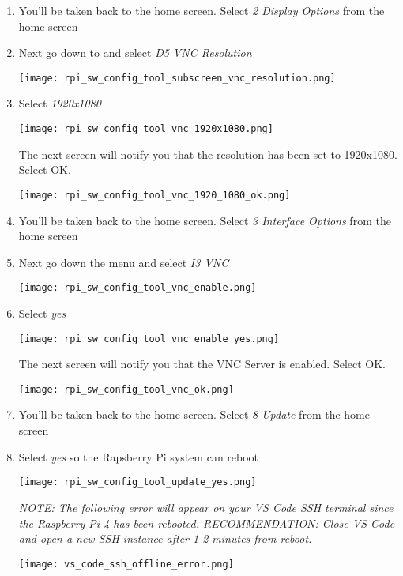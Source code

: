 \documentclass[journal]{IEEEtran}
\begin{document}
\begin{enumerate}
        \item You'll be taken back to the home screen. Select \emph{2 Display Options} from the home screen
        
        \item Next go down to and select \emph{D5 VNC Resolution}
        
        \texttt{[image: rpi\_sw\_config\_tool\_subscreen\_vnc\_resolution.png]}
        
        \item Select \emph{1920x1080}
        
        \texttt{[image: rpi\_sw\_config\_tool\_vnc\_1920x1080.png]}

        The next screen will notify you that the resolution has been set to 1920x1080. Select OK.

        \texttt{[image: rpi\_sw\_config\_tool\_vnc\_1920\_1080\_ok.png]}
        
        \item You'll be taken back to the home screen. Select \emph{3 Interface Options} from the home screen

        \item Next go down the menu and select \emph{I3 VNC}
        
        \texttt{[image: rpi\_sw\_config\_tool\_vnc\_enable.png]}

        \item Select \emph{yes}
        
        \texttt{[image: rpi\_sw\_config\_tool\_vnc\_enable\_yes.png]}

        The next screen will notify you that the VNC Server is enabled. Select OK.

        \texttt{[image: rpi\_sw\_config\_tool\_vnc\_ok.png]}

        \item You'll be taken back to the home screen. Select \emph{8 Update} from the home screen

        \item Select \emph{yes} so the Rapsberry Pi system can reboot
        
        \texttt{[image: rpi\_sw\_config\_tool\_update\_yes.png]}

        \emph{NOTE: The following error will appear on your VS Code SSH terminal since the Raspberry Pi 4 has been rebooted. \newline RECOMMENDATION: Close VS Code and open a new SSH instance after 1-2 minutes from reboot.} \newline

        \texttt{[image: vs\_code\_ssh\_offline\_error.png]}

    \end{enumerate}
\end{document}
